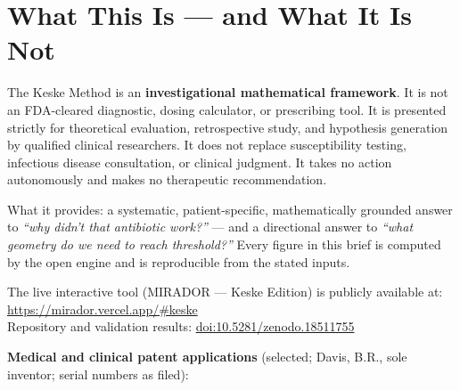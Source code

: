 \documentclass[11pt]{article}
\begin{document}
\section{What This Is — and What It Is Not}\label{sec:whatis}

The Keske Method is an \textbf{investigational mathematical framework}. It is not
an FDA-cleared diagnostic, dosing calculator, or prescribing tool. It is
presented strictly for theoretical evaluation, retrospective study, and
hypothesis generation by qualified clinical researchers. It does not replace
susceptibility testing, infectious disease consultation, or clinical judgment. It
takes no action autonomously and makes no therapeutic recommendation.

What it provides: a systematic, patient-specific, mathematically grounded answer
to \textit{``why didn't that antibiotic work?''} — and a directional answer to
\textit{``what geometry do we need to reach threshold?''} Every figure in this
brief is computed by the open engine and is reproducible from the stated inputs.

The live interactive tool (MIRADOR — Keske Edition) is publicly available at:\\
\url{https://mirador.vercel.app/\#keske}\\[2pt]
Repository and validation results: \href{https://doi.org/10.5281/zenodo.18511755}{doi:10.5281/zenodo.18511755}

\vspace{6pt}
\textbf{Medical and clinical patent applications} (selected; Davis, B.R., sole
inventor; serial numbers as filed):
\end{document}
